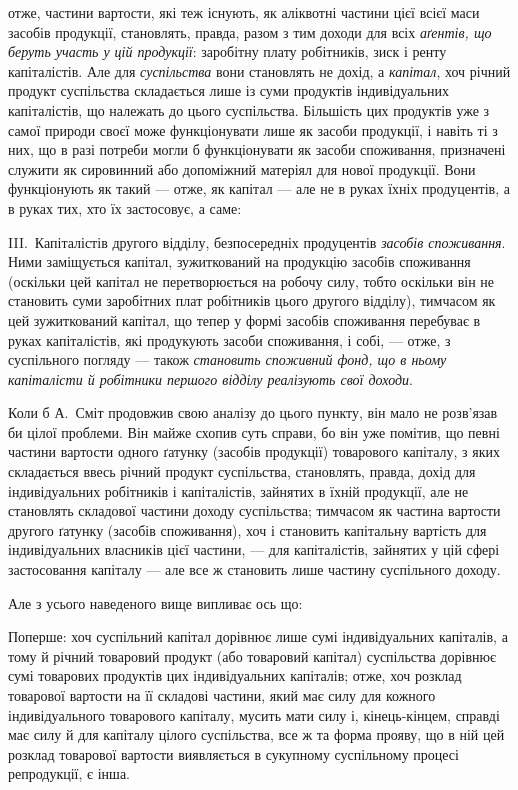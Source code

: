\parcont{}  %
отже, частини вартости, які теж існують, як аліквотні частини цієї всієї
маси засобів продукції, становлять, правда, разом з тим доходи для
всіх \emph{аґентів, що беруть участь у цій продукції}: заробітну
плату робітників, зиск і ренту капіталістів. Але для \emph{суспільства}
вони становлять не дохід, а \emph{капітал}, хоч річний продукт суспільства
складається лише із суми продуктів індивідуальних капіталістів, що належать
до цього суспільства. Більшість цих продуктів уже з самої природи
своєї може функціонувати лише як засоби продукції, і навіть ті з них,
що в разі потреби могли б функціонувати як засоби споживання, призначені
служити як сировинний або допоміжний матеріял для нової продукції.
Вони функціонують як такий — отже, як капітал — але не в руках
їхніх продуцентів, а в руках тих, хто їх застосовує, а саме:

III.~Капіталістів другого відділу, безпосередніх продуцентів \emph{засобів
споживання}. Ними заміщується капітал, зужиткований на продукцію
засобів споживання (оскільки цей капітал не перетворюється на робочу
силу, тобто оскільки він не становить суми заробітних плат робітників
цього другого відділу), тимчасом як цей зужиткований капітал, що тепер
у формі засобів споживання перебуває в руках капіталістів, які продукують
засоби споживання, і собі, — отже, з суспільного погляду — також
\emph{становить споживний фонд, що в ньому капіталісти
й робітники першого відділу реалізують свої доходи}.

Коли б А.~Сміт продовжив свою аналізу до цього пункту, він мало
не роз\-в’я\-зав би цілої проблеми. Він майже схопив суть справи, бо він
уже помітив, що певні частини вартости одного ґатунку (засобів продукції)
товарового капіталу, з яких складається ввесь річний продукт
суспільства, становлять, правда, дохід для індивідуальних робітників і капіталістів,
зайнятих в їхній продукції, але не становлять складової частини
доходу суспільства; тимчасом як частина вартости другого ґатунку
(засобів споживання), хоч і становить капітальну вартість для індивідуальних
власників цієї частини, — для капіталістів, зайнятих у цій сфері
застосовання капіталу — але все ж становить лише частину суспільного
доходу.

Але з усього наведеного вище випливає ось що:

Поперше: хоч суспільний капітал дорівнює лише сумі індивідуальних
капіталів, а тому й річний товаровий продукт (або товаровий капітал)
суспільства дорівнює сумі товарових продуктів цих індивідуальних капіталів;
отже, хоч розклад товарової вартости на її складові частини, який має
силу для кожного індивідуального товарового капіталу, мусить мати силу
і, кінець-кінцем, справді має силу й для капіталу цілого суспільства, все ж
та форма прояву, що в ній цей розклад товарової вартости виявляється
в сукупному суспільному процесі репродукції, є інша.

